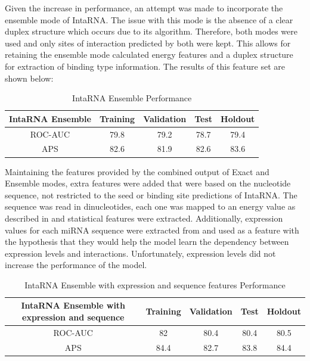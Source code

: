 \documentclass[en,ack]{dimscthesis}
\begin{document}
Given the increase in performance, an attempt was made to incorporate the ensemble mode of IntaRNA. The issue with this mode is the absence of a clear duplex structure which occurs due to its algorithm. Therefore, both modes were used and only sites of interaction predicted by both were kept. This allows for retaining the ensemble mode calculated energy features and a duplex structure for extraction of binding type information. The results of this feature set are shown below:

\begin{table}[H]
    \caption{IntaRNA Ensemble Performance}
    \label{tbl:IntaRNA Ensemble Performance}
    \begin{center} %
        \begin{tabular}{c|c|c|c|c}
            \textbf{IntaRNA Ensemble} & \textbf{Training} & \textbf{Validation}& \textbf{Test}& \textbf{Holdout} \\
            \hline
			ROC-AUC & 79.8 & 79.2 & 78.7 & 79.4 \\
			APS & 82.6 & 81.9 & 82.6 & 83.6 \\
            \hline
        \end{tabular}
    \end{center}
\end{table}

Maintaining the features provided by the combined output of Exact and Ensemble modes, extra features were added that were based on the nucleotide sequence, not restricted to the seed or binding site predictions of IntaRNA. The sequence was read in dinucleotides, each one was mapped to an energy value as described in  and statistical features were extracted. Additionally, expression values for each miRNA sequence were extracted from \cite{manakovScalableDeepProfiling2022} and used as a feature with the hypothesis that they would help the model learn the dependency between expression levels and interactions. Unfortunately, expression levels did not increase the performance of the model.

\begin{table}[H]
    \caption{IntaRNA Ensemble with expression and sequence features Performance}
    \label{tbl:IntaRNA Ensemble with expression and sequence features Performance}
    \begin{center} %
        \begin{tabular}{c|c|c|c|c}
            \textbf{IntaRNA Ensemble with expression and sequence} & \textbf{Training} & \textbf{Validation}& \textbf{Test}& \textbf{Holdout} \\
            \hline
			ROC-AUC & 82 & 80.4 & 80.4 & 80.5 \\
			APS & 84.4 & 82.7 & 83.8 & 84.4 \\
            \hline
        \end{tabular}
    \end{center}
\end{table}
\end{document}
